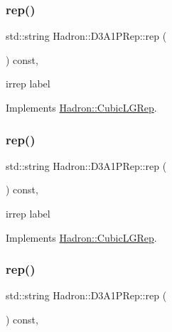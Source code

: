 \subsubsection{\texorpdfstring{rep()}{rep()}\hspace{0.1cm}{\footnotesize\ttfamily [1/3]}}
{\footnotesize\ttfamily std\+::string Hadron\+::\+D3\+A1\+P\+Rep\+::rep (\begin{DoxyParamCaption}{ }\end{DoxyParamCaption}) const\hspace{0.3cm}{\ttfamily [inline]}, {\ttfamily [virtual]}}

irrep label 

Implements \mbox{\hyperlink{structHadron_1_1CubicLGRep_a50f5ddbb8f4be4cee0106fa9e8c75e6c}{Hadron\+::\+Cubic\+L\+G\+Rep}}.

\mbox{\label{structHadron_1_1D3A1PRep_a264020426c9fd4e916cae2cb95f1dc8b}} 
\subsubsection{\texorpdfstring{rep()}{rep()}\hspace{0.1cm}{\footnotesize\ttfamily [2/3]}}
{\footnotesize\ttfamily std\+::string Hadron\+::\+D3\+A1\+P\+Rep\+::rep (\begin{DoxyParamCaption}{ }\end{DoxyParamCaption}) const\hspace{0.3cm}{\ttfamily [inline]}, {\ttfamily [virtual]}}

irrep label 

Implements \mbox{\hyperlink{structHadron_1_1CubicLGRep_a50f5ddbb8f4be4cee0106fa9e8c75e6c}{Hadron\+::\+Cubic\+L\+G\+Rep}}.

\mbox{\label{structHadron_1_1D3A1PRep_a264020426c9fd4e916cae2cb95f1dc8b}} 
\subsubsection{\texorpdfstring{rep()}{rep()}\hspace{0.1cm}{\footnotesize\ttfamily [3/3]}}
{\footnotesize\ttfamily std\+::string Hadron\+::\+D3\+A1\+P\+Rep\+::rep (\begin{DoxyParamCaption}{ }\end{DoxyParamCaption}) const\hspace{0.3cm}{\ttfamily [inline]}, {\ttfamily [virtual]}}

